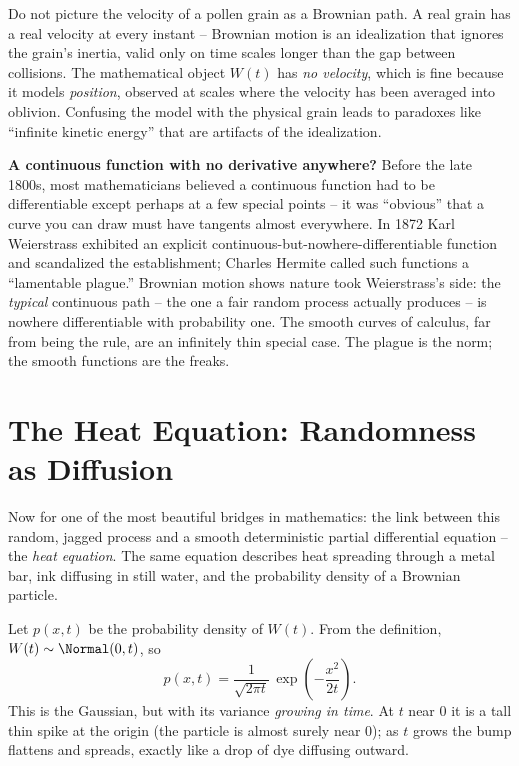 \begin{trapbox}
Do not picture the velocity of a pollen grain as a Brownian path. A real grain has
a real velocity at every instant -- Brownian motion is an idealization that
ignores the grain's inertia, valid only on time scales longer than the gap
between collisions. The mathematical object $W(t)$ has \emph{no velocity}, which
is fine because it models \emph{position}, observed at scales where the velocity
has been averaged into oblivion. Confusing the model with the physical grain leads
to paradoxes like ``infinite kinetic energy'' that are artifacts of the
idealization.
\end{trapbox}

\begin{paradoxbox}
\textbf{A continuous function with no derivative anywhere?} Before the late
1800s, most mathematicians believed a continuous function had to be
differentiable except perhaps at a few special points -- it was ``obvious'' that
a curve you can draw must have tangents almost everywhere. In 1872 Karl
Weierstrass exhibited an explicit continuous-but-nowhere-differentiable function
and scandalized the establishment; Charles Hermite called such functions a
``lamentable plague.'' Brownian motion shows nature took Weierstrass's side: the
\emph{typical} continuous path -- the one a fair random process actually produces
-- is nowhere differentiable with probability one. The smooth curves of calculus,
far from being the rule, are an infinitely thin special case. The plague is the
norm; the smooth functions are the freaks.
\end{paradoxbox}

\section{The Heat Equation: Randomness as Diffusion}
\label{ch29:heat}

Now for one of the most beautiful bridges in mathematics: the link between this
random, jagged process and a smooth deterministic partial differential equation
-- the \emph{heat equation}. The same equation describes heat spreading through a
metal bar, ink diffusing in still water, and the probability density of a
Brownian particle.

Let $p(x,t)$ be the probability density of $W(t)$. From the definition,
$W(t)\sim\Normal(0,t)$, so
\[
  p(x,t) = \frac{1}{\sqrt{2\pi t}}\,\exp\!\left(-\frac{x^2}{2t}\right).
\]
This is the Gaussian, but with its variance \emph{growing in time}. At $t$ near
$0$ it is a tall thin spike at the origin (the particle is almost surely near
$0$); as $t$ grows the bump flattens and spreads, exactly like a drop of dye
diffusing outward.

